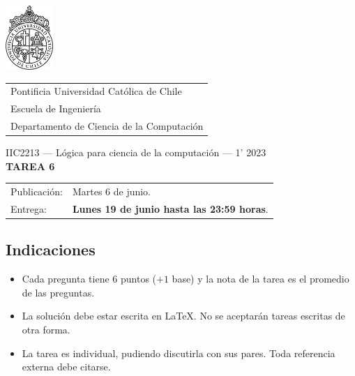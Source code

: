 \documentclass{article}
\begin{document}
\includegraphics[width=1.8cm]{uc.png}
\vspace*{-1.9cm}

\hspace*{2.1cm}
 \begin{tabular}{l}
  \sc Pontificia Universidad Católica de Chile \\
  \sc Escuela de Ingeniería \\
  \sc Departamento de Ciencia de la Computación
 \end{tabular}
 \bigskip

\vspace*{5mm}
\begin{center}
{IIC2213 --- Lógica para ciencia de la computación --- 1' 2023} \\
\vspace{3mm}
{\Large\bf TAREA 6} \\
\vspace{2mm}
\end{center}

\begin{tabular}{ll}
Publicación: & Martes 6 de junio. \\
Entrega: & \textbf{Lunes 19 de junio hasta las 23:59 horas}. \\
\end{tabular}

\subsection*{Indicaciones}

\begin{itemize}
\item Cada pregunta tiene 6 puntos ($+1$ base) y la nota de la tarea es el promedio de  las preguntas.
\item La solución debe estar escrita en \LaTeX. No se aceptarán tareas escritas de otra forma.
\item La tarea es individual, pudiendo discutirla con sus pares. Toda referencia externa debe citarse.
\end{itemize}
\end{document}
